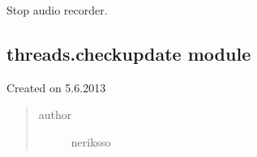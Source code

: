 \documentclass[letterpaper,10pt,english]{sphinxmanual}
\begin{document}
\begin{fulllineitems}
\begin{fulllineitems}
\end{fulllineitems}


\begin{fulllineitems}
\label{threads:threads.audiorecorder.AudioRecorder.stop}
Stop audio recorder.

\end{fulllineitems}


\end{fulllineitems}



\subsection{threads.checkupdate module}
\label{threads:threads-checkupdate-module}\label{threads:module-threads.checkupdate}
Created on 5.6.2013
\begin{quote}\begin{description}
\item[{author}] \leavevmode
neriksso

\end{description}\end{quote}
\end{document}
